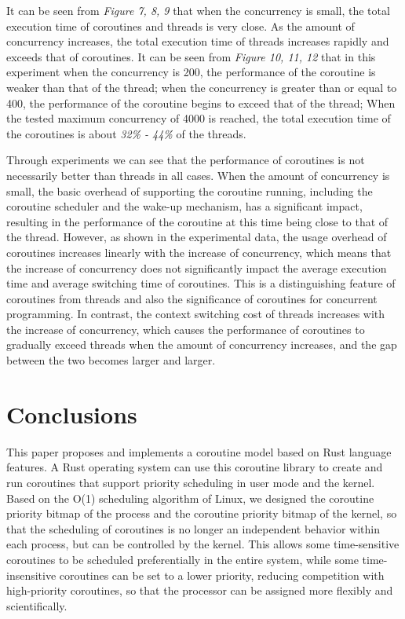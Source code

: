 \documentclass[10pt]{article}
\begin{document}
It can be seen from \textit{Figure 7, 8, 9} that when the concurrency is small, the total execution time of coroutines and threads is very close. As the amount of concurrency increases, the total execution time of threads increases rapidly and exceeds that of coroutines. It can be seen from \textit{Figure 10, 11, 12} that in this experiment when the concurrency is 200, the performance of the coroutine is weaker than that of the thread; when the concurrency is greater than or equal to 400, the performance of the coroutine begins to exceed that of the thread; When the tested maximum concurrency of 4000 is reached, the total execution time of the coroutines is about \textit{32\% - 44\%} of the threads.

Through experiments we can see that the performance of coroutines is not necessarily better than threads in all cases. When the amount of concurrency is small, the basic overhead of supporting the coroutine running, including the coroutine scheduler and the wake-up mechanism, has a significant impact, resulting in the performance of the coroutine at this time being close to that of the thread. However, as shown in the experimental data, the usage overhead of coroutines increases linearly with the increase of concurrency, which means that the increase of concurrency does not significantly impact the average execution time and average switching time of coroutines. This is a distinguishing feature of coroutines from threads and also the significance of coroutines for concurrent programming. In contrast, the context switching cost of threads increases with the increase of concurrency, which causes the performance of coroutines to gradually exceed threads when the amount of concurrency increases, and the gap between the two becomes larger and larger.

\section{Conclusions}

This paper proposes and implements a coroutine model based on Rust language features. A Rust operating system can use this coroutine library to create and run coroutines that support priority scheduling in user mode and the kernel.  Based on the O(1) scheduling algorithm of Linux, we designed the coroutine priority bitmap of the process and the coroutine priority bitmap of the kernel, so that the scheduling of coroutines is no longer an independent behavior within each process, but can be controlled by the kernel. This allows some time-sensitive coroutines to be scheduled preferentially in the entire system, while some time-insensitive coroutines can be set to a lower priority, reducing competition with high-priority coroutines, so that the processor can be assigned more flexibly and scientifically.
\end{document}
